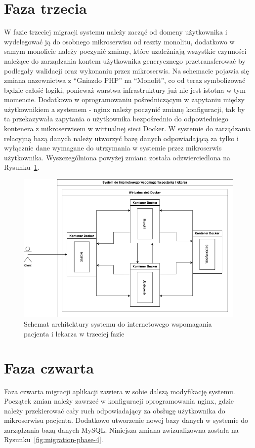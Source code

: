 \documentclass[12pt,twoside]{book}
\newcommand{\captionvspace}{\vspace{6pt}}
\begin{document}
\section{Faza trzecia}
W fazie trzeciej migracji systemu należy zacząć od domeny użytkownika i wydelegować ją do osobnego mikroserwisu od reszty monolitu, dodatkowo w samym monolicie należy poczynić zmiany, które uzależniają wszystkie czynności należące do zarządzania kontem użytkownika generycznego przetransferować by podlegały walidacji oraz wykonaniu przez mikroserwis. Na schemacie pojawia się zmiana nazewnictwa z “Gniazdo PHP” na “Monolit”, co od teraz symbolizować będzie całość logiki, ponieważ warstwa infrastruktury już nie jest istotna w tym momencie. Dodatkowo w oprogramowaniu pośredniczącym w zapytaniu między użytkownikiem a systemem - nginx należy poczynić zmianę konfiguracji, tak by ta przekazywała zapytania o użytkownika bezpośrednio do odpowiedniego kontenera z mikroserwisem w wirtualnej sieci Docker. W systemie do zarządzania relacyjną bazą danych należy utworzyć bazę danych odpowiadającą za tylko i wyłącznie dane wymagane do utrzymania w systemie przez mikroserwis użytkownika. Wyszczególniona powyżej zmiana została odzwierciedlona na Rysunku~\ref{fig:migration-phase-3}.

\begin{figure}[ht]
\centering
\includegraphics[width=\textwidth]{includes/images/migration-phase-3.png}
\captionvspace
\caption{Schemat architektury systemu do internetowego wspomagania pacjenta i lekarza w trzeciej fazie}
\label{fig:migration-phase-3}
\end{figure}

\section{Faza czwarta}
Faza czwarta migracji aplikacji zawiera w sobie dalszą modyfikację systemu. Początek zmian należy zawrzeć w konfiguracji oprogramowania nginx, gdzie należy przekierować cały ruch odpowiadający za obsługę użytkownika do mikroserwisu pacjenta. Dodatkowo utworzenie nowej bazy danych w systemie do zarządzania bazą danych MySQL. Niniejsza zmiana zwizualizowna została na Rysunku~\ref{fig:migration-phase-4}.
\end{document}
